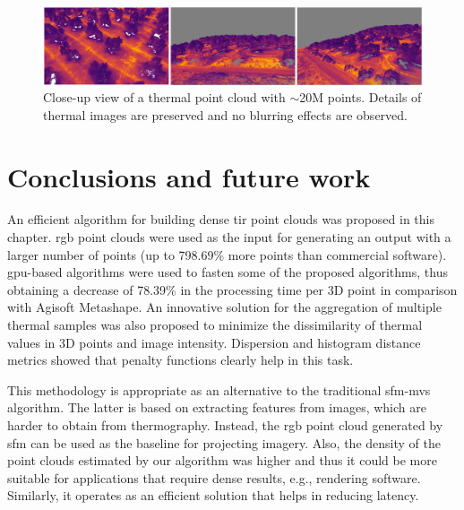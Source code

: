 \begin{figure}[hbt]
	\centering
    \includegraphics[width=.86\linewidth]{figs/thermal_projection/thermal_close_view.png}
	\caption{Close-up view of a thermal point cloud with $\sim$20M points. Details of thermal images are preserved and no blurring effects are observed.}
	\label{fig:thermal_zoomed_up}
\end{figure}

\section{Conclusions and future work}

An efficient algorithm for building dense \acrshort{tir} point clouds was proposed in this chapter. \acrshort{rgb} point clouds were used as the input for generating an output with a larger number of points (up to 798.69\% more points than commercial software). \acrshort{gpu}-based algorithms were used to fasten some of the proposed algorithms, thus obtaining a decrease of 78.39\% in the processing time per 3D point in comparison with Agisoft Metashape. An innovative solution for the aggregation of multiple thermal samples was also proposed to minimize the dissimilarity of thermal values in 3D points and image intensity. Dispersion and histogram distance metrics showed that penalty functions clearly help in this task.

This methodology is appropriate as an alternative to the traditional \acrshort{sfm}-\acrshort{mvs} algorithm. The latter is based on extracting features from images, which are harder to obtain from thermography. Instead, the \acrshort{rgb} point cloud generated by \acrshort{sfm} can be used as the baseline for projecting imagery. Also, the density of the point clouds estimated by our algorithm was higher and thus it could be more suitable for applications that require dense results, e.g., rendering software. Similarly, it operates as an efficient solution that helps in reducing latency.

